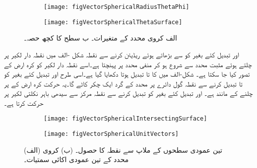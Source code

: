 \begin{figure}
\centering
\begin{subfigure}{0.5\textwidth}
\centering
\texttt{[image: figVectorSphericalRadiusThetaPhi]}
\end{subfigure}%
%
\begin{subfigure}{0.5\textwidth}
\centering
\texttt{[image: figVectorSphericalThetaSurface]}
\end{subfigure}%
\caption{{الف} کروی محدد کے متغیرات۔ {ب}  سطح  کا کچھ حصہ۔}
\label{شکل_سمتیہ_کروی_محدد_متغیرات}
\end{figure}
%
 اور  تبدیل کئے بغیر  کو  سے بڑھاتے ہوئے  ریڈیئن  کرنے سے نقطہ   شکل -الف میں نقطہ دار لکیر پر چلتے ہوئے  مثبت  محدد سے شروع ہو کر  منفی  محدد پر پہنچتا ہے۔اسے  نقطہ دار لکیر کو  کرہ ارض کے  تصور  کیا جا سکتا ہے۔  شکل-الف میں  کا  تا  تبدیل ہوتا دکھایا گیا ہے۔اسی طرح  اور  تبدیل کئے بغیر  کو  تا  تبدیل کرنے سے  نقطہ  گول دائرے پر  محدد کے گرد ایک چکر کاٹے گا۔یہ حرکت کرہ ارض کے  پر چلنے کے  مانند ہے۔ اور  تبدیل کئے بغیر  کو تبدیل کرنے سے نقطہ  مرکز سے  سیدھی باہر نکلتی لکیر پر حرکت کرتا ہے۔

\begin{figure}
\centering
\begin{subfigure}{0.5\textwidth}
\centering
\texttt{[image: figVectorSphericalIntersectingSurface]}
\end{subfigure}%
%
\begin{subfigure}{0.5\textwidth}
\centering
\texttt{[image: figVectorSphericalUnitVectors]}
\end{subfigure}%
\caption{(الف) تین عمودی سطحوں کے ملاپ سے نقطہ  کا حصول۔ (ب) کروی محدد کے تین عمودی اکائی سمتیات۔}
\label{شکل_سمتیہ_کروی_تین_سطحوں_کا_مالپ}
\end{figure}

